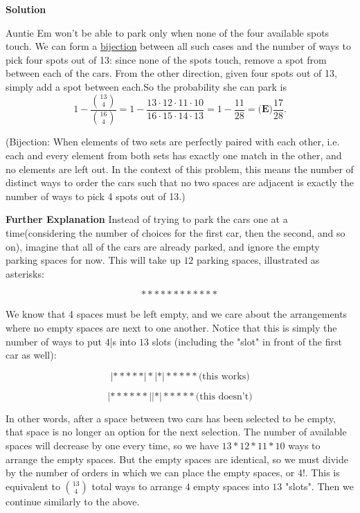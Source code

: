 \begin{enumerate}
\textbf{Solution}

Auntie Em won't be able to park only when none of the four available spots touch. We can form a \href{https://artofproblemsolving.com/wiki/index.php?title=Bijection}{bijection} between all such cases and the number of ways to pick four spots out of 13: since none of the spots touch, remove a spot from between each of the cars. From the other direction, given four spots out of 13, simply add a spot between each.So the probability she can park is 
 \[1-\frac{{13 \choose 4}}{{16 \choose 4}}=1-\frac{13\cdot12\cdot11\cdot10}{16\cdot15\cdot14\cdot13}=1-\frac{11}{28}={\textbf{(E)}\frac{17}{28}}.\]

 (Bijection: When elements of two sets are perfectly paired with each other, i.e. each and every element from both sets has exactly one match in the other, and no elements are left out. In the context of this problem, this means the number of distinct ways to order the cars such that no two spaces are adjacent is exactly the number of ways to pick 4 spots out of 13.)

 \textbf{Further Explanation} Instead of trying to park the cars one at a time(considering the number of choices for the first car, then the second, and so on), imagine that all of the cars are already parked, and ignore the empty parking spaces for now. This will take up $12$ parking spaces, illustrated as asterisks:

 
 \[************\]

 We know that 4 spaces must be left empty, and we care about the arrangements where no empty spaces are next to one another. Notice that this is simply the number of ways to put $4$|s into $13$ slots (including the "slot" in front of the first car as well):

 
 \[|*****|*|*|***** \text{(this works)}\]

 \[|******||*|***** \text{(this doesn't)}\]

 In other words, after a space between two cars has been selected to be empty, that space is no longer an option for the next selection. The number of available spaces will decrease by one every time, so we have $13*12*11*10$ ways to arrange the empty spaces. But the empty spaces are identical, so we must divide by the number of orders in which we can place the empty spaces, or $4!$. This is equivalent to $\binom{13}{4}$ total ways to arrange $4$ empty spaces into $13$ "slots". Then we continue similarly to the above.

 




\end{enumerate}
